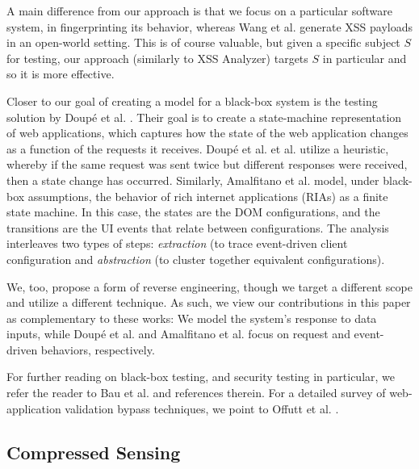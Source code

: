 A main difference from our approach is that we focus on a particular software system, in fingerprinting its behavior, whereas Wang et al. generate XSS payloads in an open-world setting. This is of course valuable, but given a specific subject $S$ for testing, our approach (similarly to XSS Analyzer) targets $S$ in particular and so it is more effective.

Closer to our goal of creating a model for a black-box system is the testing solution by Doup\'e et al. \cite{Doupe:2012}. Their goal is to create a state-machine representation of web applications, which captures
how the state of the web application changes as a function of the requests it receives. Doup\'e et al. et al. utilize a heuristic, whereby if the same request was sent twice but different responses were received, then a state change has occurred. Similarly, Amalfitano et al. \cite{Amalfitano:FT08} model, under black-box assumptions, the behavior of rich internet applications (RIAs) as a finite state machine. In this case, the states are the DOM configurations, and the transitions are the UI events that relate between configurations. The analysis interleaves two types of steps: \emph{extraction} (to trace event-driven client configuration and \emph{abstraction} (to cluster together equivalent configurations).

We, too, propose a form of reverse engineering, though we target a different scope and utilize a different technique. As such, we view our contributions in this paper as complementary to these works: We model the system's response to data inputs, while Doup\'e et al. and Amalfitano et al. focus on request and event-driven behaviors, respectively.

For further reading on black-box testing, and security testing in particular, we refer the reader to Bau et al. \cite{Bau:2010} and references therein. For a detailed survey of web-application validation bypass techniques, we point to Offutt et al. \cite{Offutt1,Offutt2,Offutt3}. 

\subsection{Compressed Sensing}